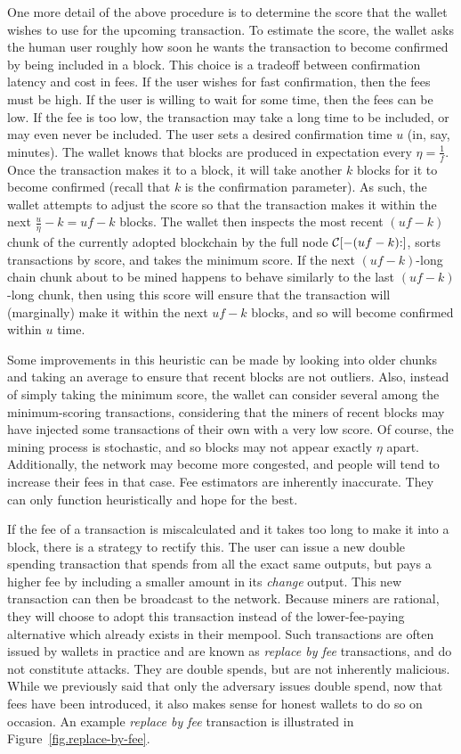 One more detail of the above procedure is to determine the score that the wallet wishes
to use for the upcoming transaction. To estimate the score, the wallet asks the human
user roughly how soon he wants the transaction to become confirmed by being included in
a block. This choice is a tradeoff between confirmation latency and cost in fees.
If the user wishes for fast confirmation, then the fees must be high.
If the user is willing to wait for some time, then the fees can be low.
If the fee is too low, the transaction may take a long time to be included,
or may even never be included.
The user sets a desired confirmation time $u$ (in, say, minutes).
The wallet knows that blocks are produced in expectation every $\eta = \frac{1}{f}$.
Once the transaction makes it to a block, it will take another $k$ blocks for it
to become confirmed (recall that $k$ is the confirmation parameter).
As such, the wallet attempts to adjust the score so that the
transaction makes it within the next $\frac{u}{\eta} - k = uf - k$ blocks.
The wallet then inspects the most recent $(uf - k)$ chunk of the currently
adopted blockchain by the full node $\mathcal{C}[{-(uf - k)}{:}]$, sorts transactions
by score, and takes the minimum score. If the next $(uf - k)$-long chain chunk
about to be mined happens to behave similarly to the last $(uf - k)$-long chunk, then using this score
will ensure that the transaction will (marginally) make it within the next
$uf - k$ blocks, and so will become confirmed within $u$ time.

Some improvements
in this heuristic can be made by looking into older chunks and taking an average
to ensure that recent blocks are not outliers. Also, instead of simply taking the
minimum score, the wallet can consider several among the minimum-scoring transactions,
considering that the miners of recent blocks may have injected some transactions
of their own with a very low score. Of course, the mining process is stochastic,
and so blocks may not appear exactly $\eta$ apart. Additionally, the network
may become more congested, and people will tend to increase their fees in
that case. Fee estimators are inherently inaccurate. They can only function
heuristically and hope for the best.

If the fee of a transaction is miscalculated and it takes too long to make it
into a block, there is a strategy to rectify this. The user can issue a new
double spending transaction that spends from all the exact same outputs, but
pays a higher fee by including a smaller amount in its \emph{change} output.
This new transaction can then be broadcast to the network. Because miners are
rational, they will choose to adopt this transaction instead of the lower-fee-paying
alternative which already exists in their mempool. Such transactions are often
issued by wallets in practice and are known as \emph{replace by fee}
transactions, and do not constitute attacks.
They are double spends, but are not inherently malicious.
While we previously said that only the adversary issues double spend,
now that fees have been introduced, it also makes sense for honest wallets
to do so on occasion. An example \emph{replace by fee} transaction is illustrated in
Figure~\ref{fig.replace-by-fee}.

